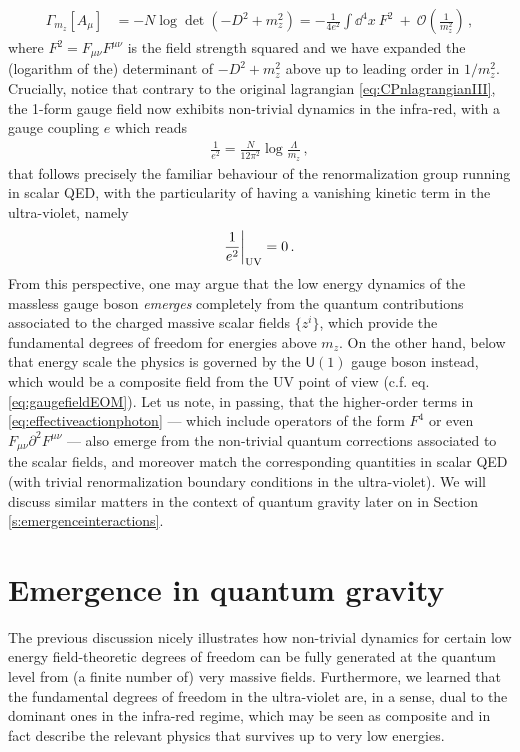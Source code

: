 %
\begin{align}
\Gamma_{m_z} \left[ A_{\mu}\right] &= - N \log \det \left( - D^2 + m_z^2 \right) = - \frac{1}{4e^2} \int \dd^4 x\ F^2\ +\ \mathcal{O} \left( \frac{1}{m_z^2}\right)\, ,
\label{eq:effectiveactionphoton}
\end{align}
%
where $F^2 = F_{\mu \nu} F^{\mu \nu}$ is the field strength squared and we have expanded the (logarithm of the) determinant of $ - D^2 + m_z^2$ above up to leading order in $1/m_z^2$. Crucially, notice that contrary to the original lagrangian \eqref{eq:CPnlagrangianIII}, the 1-form gauge field now exhibits non-trivial dynamics in the infra-red, with a gauge coupling $e$ which reads  
%
\begin{align}
\frac{1}{e^2} = \frac{N}{12 \pi^2} \log \frac{\Lambda}{m_z}\, ,
\label{eq:gauglecouplingphoton}
\end{align}
%
that follows precisely the familiar behaviour of the renormalization group running in scalar QED, with the particularity of having a vanishing kinetic term in the ultra-violet, namely
%
\begin{align}
\frac{1}{e^2} \bigg |_{\rm UV} = 0\, .
\label{eq:gauglecouplingphotonUV}
\end{align}
%
From this perspective, one may argue that the low energy dynamics of the massless gauge boson \emph{emerges} completely from the quantum contributions associated to the charged massive scalar fields $\{ z^i \}$, which provide the fundamental degrees of freedom for energies above $m_z$. On the other hand, below that energy scale the physics is governed by the $\mathsf{U}(1)$ gauge boson instead, which would be a composite field from the UV point of view (c.f. eq. \eqref{eq:gaugefieldEOM}). Let us note, in passing, that the higher-order terms in \eqref{eq:effectiveactionphoton} --- which include operators of the form $F^4$ or even $F_{\mu \nu} \partial^2 F^{\mu \nu}$ --- also emerge from the non-trivial quantum corrections associated to the scalar fields, and moreover match the corresponding quantities in scalar QED (with trivial renormalization boundary conditions in the ultra-violet). We will discuss similar matters in the context of quantum gravity later on in Section \ref{s:emergenceinteractions}.

\section{Emergence in quantum gravity}
\label{s:EmergenceQG}

The previous discussion nicely illustrates how non-trivial dynamics for certain low energy field-theoretic degrees of freedom can be fully generated at the quantum level from (a finite number of) very massive fields. Furthermore, we learned that the fundamental degrees of freedom in the ultra-violet are, in a sense, dual to the dominant ones in the infra-red regime, which may be seen as composite and in fact describe the relevant physics that survives up to very low energies.

